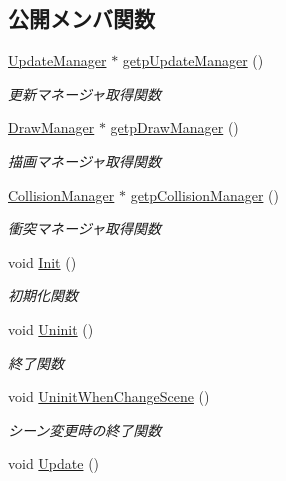 \subsection*{公開メンバ関数}
\begin{DoxyCompactItemize}
\item 
\mbox{\hyperlink{class_update_manager}{Update\+Manager}} $\ast$ \mbox{\hyperlink{class_game_object_manager_a4804852e29b6cb4c065f6a60e5b95edd}{getp\+Update\+Manager}} ()
\begin{DoxyCompactList}\small\item\em 更新マネージャ取得関数 \end{DoxyCompactList}\item 
\mbox{\hyperlink{class_draw_manager}{Draw\+Manager}} $\ast$ \mbox{\hyperlink{class_game_object_manager_a6692c72ceb9d059abeba91fd47cf3de7}{getp\+Draw\+Manager}} ()
\begin{DoxyCompactList}\small\item\em 描画マネージャ取得関数 \end{DoxyCompactList}\item 
\mbox{\hyperlink{class_collision_manager}{Collision\+Manager}} $\ast$ \mbox{\hyperlink{class_game_object_manager_a6bf9e0af21885440429e3e3b07a0451d}{getp\+Collision\+Manager}} ()
\begin{DoxyCompactList}\small\item\em 衝突マネージャ取得関数 \end{DoxyCompactList}\item 
void \mbox{\hyperlink{class_game_object_manager_abda84aa3b4c79090c43243f93b5a9c46}{Init}} ()
\begin{DoxyCompactList}\small\item\em 初期化関数 \end{DoxyCompactList}\item 
void \mbox{\hyperlink{class_game_object_manager_a4d2cb0e07fddeea160e64f6e1d2a326a}{Uninit}} ()
\begin{DoxyCompactList}\small\item\em 終了関数 \end{DoxyCompactList}\item 
void \mbox{\hyperlink{class_game_object_manager_ad962739b2c2f54d4160c3513132930da}{Uninit\+When\+Change\+Scene}} ()
\begin{DoxyCompactList}\small\item\em シーン変更時の終了関数 \end{DoxyCompactList}\item 
void \mbox{\hyperlink{class_game_object_manager_a6f053b1c655de6ca1c9a8fa9b6e118ae}{Update}} ()

\end{DoxyCompactItemize}
